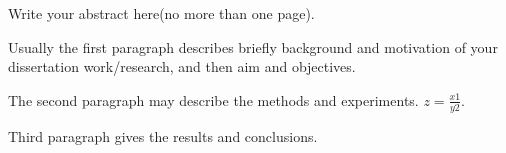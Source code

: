 

Write your abstract here(no more than one page).

Usually the first paragraph describes briefly background and
motivation of your dissertation work/research, and then aim and
objectives.

\smallskip
The second paragraph may describe the methods and experiments.
$ z = \frac{x1}{y2}$.

\smallskip
Third paragraph gives the results and conclusions.


